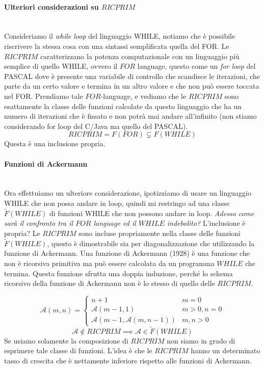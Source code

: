 \documentclass{article}
\begin{document}
\paragraph{Ulteriori considerazioni su $RICPRIM$}\mbox{}\\
Consideriamo il \textit{while loop} del linguaggio WHILE, notiamo che è possibile riscrivere la stessa cosa
con una sintassi semplificata quella del FOR.
Le $RICPRIM$ caratterizzano la potenza computazionale con un linguaggio più semplice
di quello WHILE, ovvero il $FOR$ language, questo come un \textit{for loop} del PASCAL dove è presente
una variabile di controllo che scandisce le iterazioni, che parte da un certo valore
e termina in un altro valore e che non può essere toccata nel FOR.
\newline\newline
Prendiamo tale $FOR$-language, e vediamo che le $RICPRIM$ sono esattamente la classe delle funzioni
calcolate da questo linguaggio che ha un numero di iterazioni che è fissato e non
potrà mai andare all'infinito (non stiamo considerando for loop del C/Java ma quello del PASCAL).
$$RICPRIM=F(FOR)\subsetneq F(WHILE)$$
Questa è una inclusione propria.

\paragraph{Funzioni di Ackermann}\mbox{}\\
Ora effettuiamo un ulteriore considerazione, ipotizziamo di usare un linguaggio WHILE
che non possa andare in loop, quindi mi restringo ad una classe $\tilde{F}(WHILE)$
di funzioni WHILE che non possono andare in loop. \textit{Adesso come sarà il
    confronto tra il $FOR$ language ed il $WHILE$ indebolito?} L'inclusione è propria?
\newline
Le $RICPRIM$ sono incluse propriamente nella classe delle funzioni $\tilde{F}(WHILE)$,
questo è dimostrabile sia per diagonalizzazione che utilizzando la funzione di Ackermann.
Una funzione di Ackermann (1928) è una funzione che non è ricorsiva primitiva ma
può essere calcolata da un programma $WHILE$ che termina.
\newline\newline
Questa funzione sfrutta una doppia induzione, perché lo schema ricorsivo della funzione
di Ackermann non è lo stesso di quello delle $RICPRIM$.

\[
    \mathcal{A}(m,n)=
    \begin{cases}
        n+1                                 & m=0      \\
        \mathcal{A}(m-1,1)                  & m>0, n=0 \\
        \mathcal{A}(m-1,\mathcal{A}(m,n-1)) & m,n>0
    \end{cases}
\]
$$\mathcal{A}\notin RICPRIM\implies\mathcal{A}\in\tilde{F}(WHILE)$$
Se usiamo solamente la composizione di $RICPRIM$ non siamo in grado di esprimere tale
classe di funzioni. L'idea è che le $RICPRIM$ hanno un determinato tasso di crescita
che è nettamente inferiore rispetto alle funzioni di Ackermann.
\end{document}
